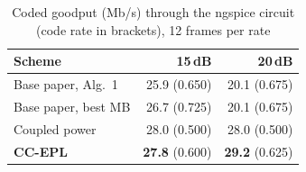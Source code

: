 \begin{table}[t]\centering\footnotesize
\caption{Coded goodput (Mb/s) through the ngspice circuit (code rate in brackets), 12 frames per rate}\label{tab:spicecoded}
\begin{tabular}{@{}lrr@{}}\toprule
Scheme & 15\,dB & 20\,dB \\\midrule
Base paper, Alg.~1 & 25.9 (0.650) & 20.1 (0.675) \\
Base paper, best MB & 26.7 (0.725) & 20.1 (0.675) \\
Coupled power~\cite{ling2020} & 28.0 (0.500) & 28.0 (0.500) \\
\textbf{CC-EPL} & \textbf{27.8} (0.600) & \textbf{29.2} (0.625) \\
\bottomrule\end{tabular}\end{table}
